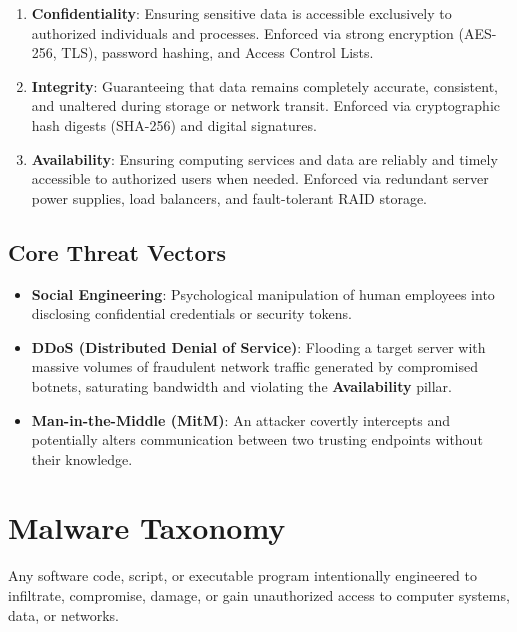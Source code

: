 \begin{enumerate}[leftmargin=1.5em]
    \item \textbf{Confidentiality}: Ensuring sensitive data is accessible exclusively to authorized individuals and processes. Enforced via strong encryption (AES-256, TLS), password hashing, and Access Control Lists.
    \item \textbf{Integrity}: Guaranteeing that data remains completely accurate, consistent, and unaltered during storage or network transit. Enforced via cryptographic hash digests (SHA-256) and digital signatures.
    \item \textbf{Availability}: Ensuring computing services and data are reliably and timely accessible to authorized users when needed. Enforced via redundant server power supplies, load balancers, and fault-tolerant RAID storage.
\end{enumerate}

\subsection{Core Threat Vectors}
\begin{itemize}[leftmargin=1.5em]
    \item \textbf{Social Engineering}: Psychological manipulation of human employees into disclosing confidential credentials or security tokens.
    \item \textbf{DDoS (Distributed Denial of Service)}: Flooding a target server with massive volumes of fraudulent network traffic generated by compromised botnets, saturating bandwidth and violating the \textbf{Availability} pillar.
    \item \textbf{Man-in-the-Middle (MitM)}: An attacker covertly intercepts and potentially alters communication between two trusting endpoints without their knowledge.
\end{itemize}

\section{Malware Taxonomy}

\begin{definition}
Any software code, script, or executable program intentionally engineered to infiltrate, compromise, damage, or gain unauthorized access to computer systems, data, or networks.
\end{definition}

